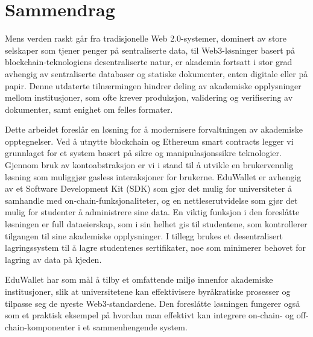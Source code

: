 \chapter*{Sammendrag}
Mens verden raskt går fra tradisjonelle Web 2.0-systemer, dominert av store selskaper som tjener penger på sentraliserte data, til Web3-løsninger basert på blockchain-teknologiens desentraliserte natur, er akademia fortsatt i stor grad avhengig av sentraliserte databaser og statiske dokumenter, enten digitale eller på papir. Denne utdaterte tilnærmingen hindrer deling av akademiske opplysninger mellom institusjoner, som ofte krever produksjon, validering og verifisering av dokumenter, samt enighet om felles formater.

Dette arbeidet foreslår en løsning for å modernisere forvaltningen av akademiske opptegnelser. Ved å utnytte blockchain og Ethereum smart contracts legger vi grunnlaget for et system basert på sikre og manipulasjonssikre teknologier. Gjennom bruk av kontoabstraksjon er vi i stand til å utvikle en brukervennlig løsning som muliggjør gasless interaksjoner for brukerne. EduWallet er avhengig av et Software Development Kit (SDK) som gjør det mulig for universiteter å samhandle med on-chain-funksjonaliteter, og en nettleserutvidelse som gjør det mulig for studenter å administrere sine data. En viktig funksjon i den foreslåtte løsningen er full dataeierskap, som i sin helhet gis til studentene, som kontrollerer tilgangen til sine akademiske opplysninger. I tillegg brukes et desentralisert lagringssystem til å lagre studentenes sertifikater, noe som minimerer behovet for lagring av data på kjeden.

EduWallet har som mål å tilby et omfattende miljø innenfor akademiske institusjoner, slik at universitetene kan effektivisere byråkratiske prosesser og tilpasse seg de nyeste Web3-standardene. Den foreslåtte løsningen fungerer også som et praktisk eksempel på hvordan man effektivt kan integrere on-chain- og off-chain-komponenter i et sammenhengende system.